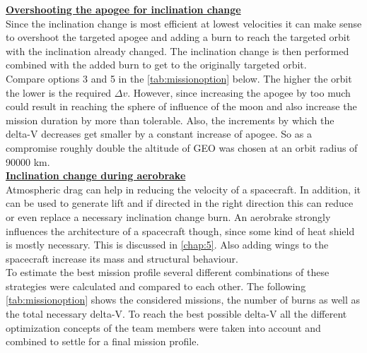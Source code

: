 \textbf{\underline{Overshooting the apogee for inclination change}}\\
Since the inclination change is most efficient at lowest velocities it can make sense to overshoot the
targeted apogee and adding a burn to reach the targeted orbit with the inclination already changed. The
inclination change is then performed combined with the added burn to get to the originally targeted orbit.\\

Compare options 3 and 5 in the \autoref{tab:missionoption} below. The higher the orbit the lower is the required $\Delta v$.
However, since increasing the apogee by too much could result in reaching the sphere of influence of the
moon and also increase the mission duration by more than tolerable. Also, the increments by which the
delta-V decreases get smaller by a constant increase of apogee. So as a compromise roughly double the
altitude of GEO was chosen at an orbit radius of 90000 km.\\

\textbf{\underline{Inclination change during aerobrake}}\\
Atmospheric drag can help in reducing the velocity of a spacecraft. In addition, it can be used to generate lift and if directed in the right direction this can reduce or even replace a necessary inclination change burn. An aerobrake strongly influences the architecture of a spacecraft though, since some kind of heat shield is mostly necessary. This is discussed in \autoref{chap:5}. Also adding wings to the spacecraft increase its mass and structural behaviour.\\

To estimate the best mission profile several different combinations of these strategies were calculated
and compared to each other. The following \autoref{tab:missionoption} shows the considered missions, the number of burns as well as the total necessary delta-V. To reach the best possible delta-V all the different optimization concepts of the team members were taken into account and combined to settle for a final mission profile.


